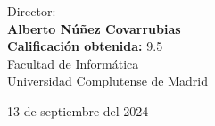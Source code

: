 \begin{titlepage}
\begin{center}
		\vspace{1cm}
		
		Director:\\
		\textbf{Alberto Núñez Covarrubias}\\
		\vspace{0.6cm}
		\textbf{Calificación obtenida:} 9.5\\
		\vspace{1.2cm}
		Facultad de Informática\\
		Universidad Complutense de Madrid
		\vspace{0.5cm}
		
		13 de septiembre del 2024
		
		\vspace{0.2cm}
		
	\end{center}
\end{titlepage}